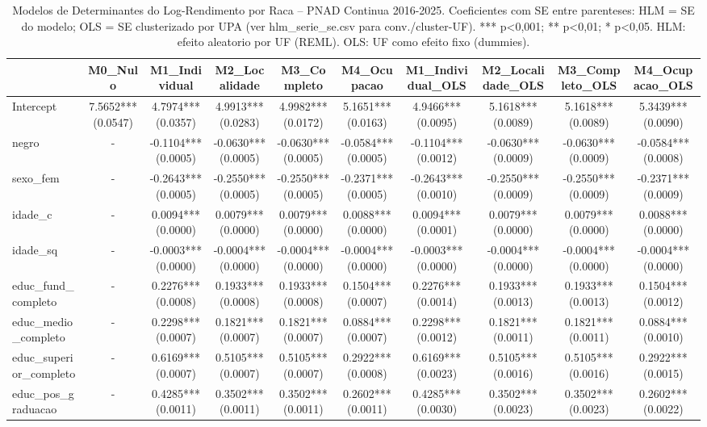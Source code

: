 \begin{table}
\caption{Modelos de Determinantes do Log-Rendimento por Raca -- PNAD Continua 2016-2025. Coeficientes com SE entre parenteses: HLM = SE do modelo; OLS = SE clusterizado por UPA (ver hlm_serie_se.csv para conv./cluster-UF). *** p<0,001; ** p<0,01; * p<0,05. HLM: efeito aleatorio por UF (REML). OLS: UF como efeito fixo (dummies).}
\label{tab:hlm_serie_completa}
\begin{tabular}{lccccccccc}
\toprule
 & M0_Nulo & M1_Individual & M2_Localidade & M3_Completo & M4_Ocupacao & M1_Individual_OLS & M2_Localidade_OLS & M3_Completo_OLS & M4_Ocupacao_OLS \\
\midrule
Intercept & 7.5652*** (0.0547) & 4.7974*** (0.0357) & 4.9913*** (0.0283) & 4.9982*** (0.0172) & 5.1651*** (0.0163) & 4.9466*** (0.0095) & 5.1618*** (0.0089) & 5.1618*** (0.0089) & 5.3439*** (0.0090) \\
negro & - & -0.1104*** (0.0005) & -0.0630*** (0.0005) & -0.0630*** (0.0005) & -0.0584*** (0.0005) & -0.1104*** (0.0012) & -0.0630*** (0.0009) & -0.0630*** (0.0009) & -0.0584*** (0.0008) \\
sexo_fem & - & -0.2643*** (0.0005) & -0.2550*** (0.0005) & -0.2550*** (0.0005) & -0.2371*** (0.0005) & -0.2643*** (0.0010) & -0.2550*** (0.0009) & -0.2550*** (0.0009) & -0.2371*** (0.0009) \\
idade_c & - & 0.0094*** (0.0000) & 0.0079*** (0.0000) & 0.0079*** (0.0000) & 0.0088*** (0.0000) & 0.0094*** (0.0001) & 0.0079*** (0.0000) & 0.0079*** (0.0000) & 0.0088*** (0.0000) \\
idade_sq & - & -0.0003*** (0.0000) & -0.0004*** (0.0000) & -0.0004*** (0.0000) & -0.0004*** (0.0000) & -0.0003*** (0.0000) & -0.0004*** (0.0000) & -0.0004*** (0.0000) & -0.0004*** (0.0000) \\
educ_fund_completo & - & 0.2276*** (0.0008) & 0.1933*** (0.0008) & 0.1933*** (0.0008) & 0.1504*** (0.0007) & 0.2276*** (0.0014) & 0.1933*** (0.0013) & 0.1933*** (0.0013) & 0.1504*** (0.0012) \\
educ_medio_completo & - & 0.2298*** (0.0007) & 0.1821*** (0.0007) & 0.1821*** (0.0007) & 0.0884*** (0.0007) & 0.2298*** (0.0012) & 0.1821*** (0.0011) & 0.1821*** (0.0011) & 0.0884*** (0.0010) \\
educ_superior_completo & - & 0.6169*** (0.0007) & 0.5105*** (0.0007) & 0.5105*** (0.0007) & 0.2922*** (0.0008) & 0.6169*** (0.0023) & 0.5105*** (0.0016) & 0.5105*** (0.0016) & 0.2922*** (0.0015) \\
educ_pos_graduacao & - & 0.4285*** (0.0011) & 0.3502*** (0.0011) & 0.3502*** (0.0011) & 0.2602*** (0.0011) & 0.4285*** (0.0030) & 0.3502*** (0.0023) & 0.3502*** (0.0023) & 0.2602*** (0.0022) \\

\end{tabular}
\end{table}
